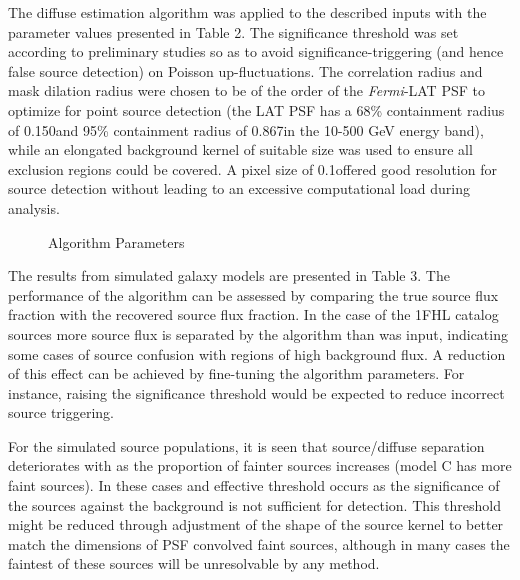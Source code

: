 \documentclass{PoS}
\begin{document}
The diffuse estimation algorithm was applied to the described inputs with the parameter values presented in Table 2. The significance threshold was set according to preliminary studies so as to avoid significance-triggering (and hence false source detection) on Poisson up-fluctuations. The correlation radius and mask dilation radius were chosen to be of the order of the \textit{Fermi}-LAT PSF to optimize for point source detection (the LAT PSF has a 68\% containment radius of 0.150\degree and 95\% containment radius of 0.867\degree in the 10-500 GeV energy band), while an elongated background kernel of suitable size was used to ensure all exclusion regions could be covered. A pixel size of 0.1\degree offered good resolution for source detection without leading to an excessive computational load during analysis.

\begin{figure}
\vspace{-10pt}
\centering
{}
\makeatletter
\def\@captype{table}
\makeatother
\caption{Algorithm Parameters}
\vspace{-10pt}
\end{figure}

The results from simulated galaxy models are presented in Table 3. The performance of the algorithm can be assessed by comparing the true source flux fraction with the recovered source flux fraction. In the case of the 1FHL catalog sources more source flux is separated by the algorithm than was input, indicating some cases of source confusion with regions of high background flux. A reduction of this effect can be achieved by fine-tuning the algorithm parameters. For instance, raising the significance threshold would be expected to reduce incorrect source triggering.

For the simulated source populations, it is seen that source/diffuse separation deteriorates with as the proportion of fainter sources increases (model C has more faint sources). In these cases and effective threshold occurs as the significance of the sources against the background is not sufficient for detection. This threshold might be reduced through adjustment of the shape of the source kernel to better match the dimensions of PSF convolved faint sources, although in many cases the faintest of these sources will be unresolvable by any method.
\end{document}
